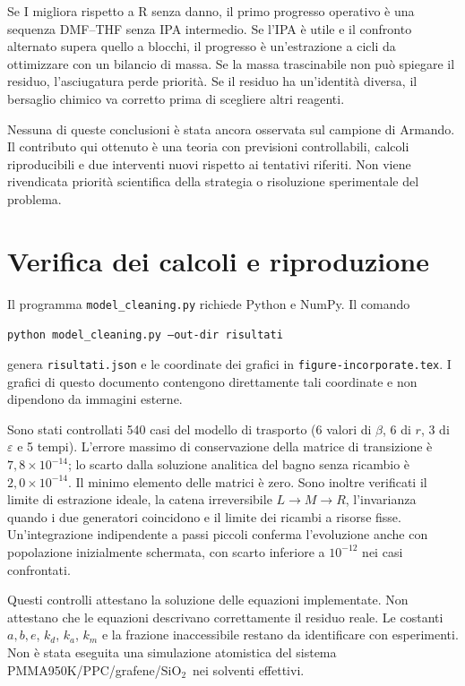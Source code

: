 \documentclass[11pt,reqno]{amsart}
\numberwithin{equation}{section}
\newcommand{\SiO}{\ensuremath{\mathrm{SiO}_2}}
\begin{document}
Se I migliora rispetto a R senza danno, il primo progresso
operativo \`e una sequenza DMF--THF senza IPA intermedio.
Se l'IPA \`e utile e il confronto alternato supera quello
a blocchi, il progresso \`e un'estrazione a cicli da ottimizzare
con un bilancio di massa. Se la massa trascinabile non pu\`o
spiegare il residuo, l'asciugatura perde priorit\`a. Se il
residuo ha un'identit\`a diversa, il bersaglio chimico va
corretto prima di scegliere altri reagenti.

Nessuna di queste conclusioni \`e stata ancora osservata sul
campione di Armando. Il contributo qui ottenuto \`e una teoria
con previsioni controllabili, calcoli riproducibili e due
interventi nuovi rispetto ai tentativi riferiti. Non viene
rivendicata priorit\`a scientifica della strategia o risoluzione
sperimentale del problema.

\appendix
\section{Verifica dei calcoli e riproduzione}

Il programma \texttt{model\_cleaning.py} richiede Python e NumPy.
Il comando
\begin{center}
\texttt{python model\_cleaning.py --out-dir risultati}
\end{center}
genera \texttt{risultati.json} e le coordinate dei grafici
in \texttt{figure-incorporate.tex}. I grafici di questo
documento contengono direttamente tali coordinate e non
dipendono da immagini esterne.

Sono stati controllati 540 casi del modello di trasporto
(6 valori di $\beta$, 6 di $r$, 3 di $\varepsilon$ e 5 tempi).
L'errore massimo di conservazione della matrice di transizione
\`e $7{,}8\times10^{-14}$; lo scarto dalla soluzione analitica
del bagno senza ricambio \`e $2{,}0\times10^{-14}$.
Il minimo elemento delle matrici \`e zero. Sono inoltre
verificati il limite di estrazione ideale, la catena
irreversibile $L\to M\to R$, l'invarianza quando i due
generatori coincidono e il limite dei ricambi a risorse fisse.
Un'integrazione indipendente a passi piccoli conferma
l'evoluzione anche con popolazione inizialmente schermata,
con scarto inferiore a $10^{-12}$ nei casi confrontati.

Questi controlli attestano la soluzione delle equazioni
implementate. Non attestano che le equazioni descrivano
correttamente il residuo reale. Le costanti $a,b,e$, $k_d$,
$k_a$, $k_m$ e la frazione inaccessibile restano da identificare
con esperimenti. Non \`e stata eseguita una simulazione
atomistica del sistema PMMA950K/PPC/grafene/\SiO\ nei
solventi effettivi.
\end{document}

